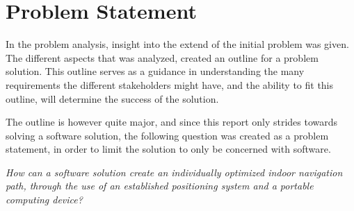\chapter{Problem Statement}

In the problem analysis, insight into the extend of the initial problem was given. The different aspects that was analyzed, created an outline for a problem solution. This outline serves as a guidance in understanding the many requirements the different stakeholders might have, and the ability to fit this outline, will determine the success of the solution.

The outline is however quite major, and since this report only strides towards solving a software solution, the following question was created as a problem statement, in order to limit the solution to only be concerned with software.

\begin{displayquote}
    \textit{How can a software solution create an individually optimized indoor navigation path, through the use of an established positioning system and a portable computing device?}\label{sub:problem_statement}
\end{displayquote}




